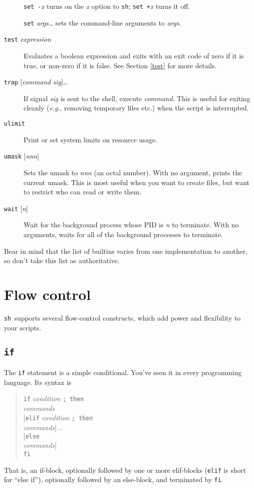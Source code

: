 \documentclass{article}
\newcommand{\code}[1]{\texttt{#1}}
\newcommand{\sh}{\code{sh}}
\begin{document}
\begin{description}
	\code{set -}\textit{x} turns on the \textit{x} option to \sh;
	\code{set +}\textit{x} turns it off.

	\code{set} \textit{args\ldots} sets the command-line arguments
	to \textit{args}.
\item[\code{test} \textit{expression}]
	Evaluates a boolean expression and exits with an exit code of
	zero if it is true, or non-zero if it is false. See Section
	\ref{test} for more details.
\item[\code{trap} {[\textit{command} \textit{sig}]}\ldots]
	If signal \textit{sig} is sent to the shell, execute
	\textit{command}. This is useful for exiting cleanly
	(\textit{e.g.}, removing temporary files etc.) when the script
	is interrupted.
\item[\code{ulimit}]
	Print or set system limits on resource usage.
\item[\code{umask} {[\textit{nnn}]}]
	Sets the umask to \textit{nnn} (an octal number). With no
	argument, prints the current umask. This is most useful when
	you want to create files, but want to restrict who can read or
	write them.
\item[\code{wait} {[\textit{n}]}]
	Wait for the background process whose PID is \textit{n} to
	terminate. With no arguments, waits for all of the background
	processes to terminate.
\end{description}

	Bear in mind that the list of builtins varies from one
implementation to another, so don't take this list as authoritative.

\section{Flow control}

	\sh\ supports several flow-control constructs, which add power
and flexibility to your scripts.

\subsection{\code{if}}

	The \code{if} statement is a simple conditional. You've seen
it in every programming language. Its syntax is
\begin{quote}
\begin{tabbing}
\code{if} \= \textit{condition} \code{; then}\\
	\> \textit{commands}\\
$[$\code{elif} \textit{condition} \code{; then}\\
	\> \textit{commands}$]\ldots$\\
$[$\code{else}\\
	\> \textit{commands}$]$\\
\code{fi}
\end{tabbing}
\end{quote}
That is, an if-block, optionally followed by one or more elif-blocks
(\code{elif} is short for ``else if''), optionally followed by an
else-block, and terminated by \code{fi}.
\end{document}
